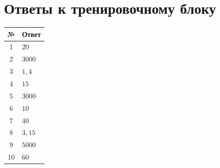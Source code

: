 \documentclass[a4paper,12pt]{article}
\begin{document}
\section*{Ответы к тренировочному блоку}

\begin{center}
\renewcommand{\arraystretch}{1.45}
\begin{tabularx}{\linewidth}{@{}cX@{}}
\toprule
\textbf{№} & \textbf{Ответ} \\
\midrule
1 & \(20\) \\
2 & \(3000\) \\
3 & \(1{,}4\) \\
4 & \(15\) \\
5 & \(3000\) \\
6 & \(10\) \\
7 & \(40\) \\
8 & \(3{,}15\) \\
9 & \(5000\) \\
10 & \(60\) \\
\bottomrule
\end{tabularx}
\end{center}
\end{document}
